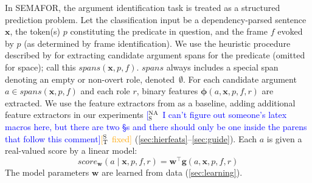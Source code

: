 \documentclass[11pt,a4paper]{article}
\newcommand{\ensuretext}[1]{#1}
\newcommand{\stmarker}{\ensuretext{\textcolor{orange}{\ensuremath{^{\textsc{S}}_{\textsc{T}}}}}}
\newcommand{\nasmarker}{\ensuretext{\textcolor{blue}{\ensuremath{^{\textsc{NA}}_{\textsc{S}}}}}}
\newcommand{\arkcomment}[3]{\ensuretext{\textcolor{#3}{[#1 #2]}}}
\newcommand{\st}[1]{\arkcomment{\stmarker}{#1}{orange}}
\newcommand{\nascomment}[1]{\arkcomment{\nasmarker}{#1}{blue}}
\begin{document}
In SEMAFOR, the argument identification task is treated as a structured
prediction problem.
Let the classification input be a dependency-parsed sentence $\mathbf{x}$, 
the token(s) $p$ constituting the predicate in question, and the frame $f$ evoked by $p$
(as determined by frame identification). 
We use the heuristic procedure described by \citep{das-14} for extracting candidate argument spans 
for the predicate (omitted for space); call this $\textit{spans}(\mathbf{x}, p, f)$.
$\textit{spans}$ always includes a special span denoting an empty or non-overt
role, denoted~$\emptyset$.
For each candidate argument $a \in \textit{spans}(\mathbf{x}, p, f)$
and each role
$r$, binary features $\mathbf{\phi}(a, \mathbf{x}, p, f, r)$ are extracted.
We use the feature extractors from \citep{das-14} as a baseline, adding
additional feature extractors in our experiments \nascomment{I can't
  figure out someone's latex macros here, but there are two \S s and
  there should only be one inside the parens that follow this comment}\st{fixed}
(\cref{sec:hierfeats}--\cref{sec:guide}). %
Each $a$ is given a real-valued score by a linear model:
\begin{equation}\label{eq:score}
\textit{score}_\mathbf{w}(a \mid \mathbf{x}, p, f, r) = \mathbf{w}^\top \mathbf{g}(a, \mathbf{x}, p, f, r)
\end{equation}
The model parameters $\mathbf{w}$ are learned from 
data (\cref{sec:learning}).

\end{document}
